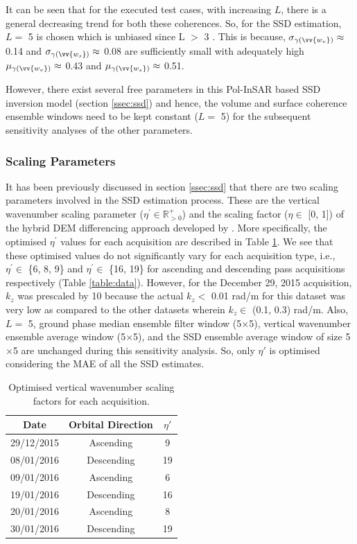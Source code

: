 \documentclass[12pt]{elsarticle}
\numberwithin{equation}{section}
\numberwithin{figure}{section}
\numberwithin{table}{section}
\begin{document}
It can be seen that for the executed test cases, with increasing $L$, there is a general decreasing trend for both these coherences. So, for the SSD estimation, $L =$ 5 is chosen which is unbiased since L $>$ 3 \citep{Cloude2010}. This is because, $\sigma_{\gamma\left(\vv{w_v}\right)} \approx$ 0.14 and $\sigma_{\gamma\left(\vv{w_s}\right)} \approx$ 0.08 are sufficiently small with adequately high $\mu_{\gamma\left(\vv{w_v}\right)} \approx$ 0.43 and $\mu_{\gamma\left(\vv{w_s}\right)} \approx$ 0.51. 

However, there exist several free parameters in this Pol-InSAR based SSD inversion model (section \ref{ssec:ssd}) and hence, the volume and surface coherence ensemble windows need to be kept constant ($L =$ 5) for the subsequent sensitivity analyses of the other parameters.

\subsubsection{Scaling Parameters}
\label{sssec:scale}
It has been previously discussed in section \ref{ssec:ssd} that there are two scaling parameters involved in the SSD estimation process. These are the vertical wavenumber scaling parameter ($\eta^\prime\in\mathbb{R}_{>0}^+$) and the scaling factor ($\eta\in$ [0, 1]) of the hybrid DEM differencing approach developed by \cite{Cloude2010}. More specifically, the optimised $\eta^\prime$ values for each acquisition are described in Table \ref{table:eta_sf}. We see that these optimised values do not significantly vary for each acquisition type, i.e., $\eta^\prime \in$ \{6, 8, 9\} and $\eta^\prime \in$ \{16, 19\} for ascending and descending pass acquisitions respectively (Table \ref{table:data}). However, for the December 29, 2015 acquisition, $k_z$ was prescaled by 10 because the actual $k_z <$ 0.01 rad/m for this dataset was very low as compared to the other datasets wherein $k_z \in$ (0.1, 0.3) rad/m. Also, $L =$ 5, ground phase median ensemble filter window (5$\times$5), vertical wavenumber ensemble average window (5$\times$5), and the SSD ensemble average window of size 5$\times$5 are unchanged during this sensitivity analysis. So, only $\eta\prime$ is optimised considering the MAE of all the SSD estimates.

\begin{table}[!htbp]
\centering
\caption{Optimised vertical wavenumber scaling factors for each acquisition.}
\label{table:eta_sf}
\begin{tabular}{ccc}
\hline
\textbf{Date} & \textbf{Orbital Direction} & \boldmath$\eta\prime$ \\ \hline
29/12/2015 & Ascending & 9   \\
08/01/2016 & Descending & 19  \\
09/01/2016 & Ascending & 6   \\
19/01/2016 & Descending & 16  \\
20/01/2016 & Ascending & 8   \\
30/01/2016 & Descending & 19 \\ \hline
\end{tabular}
\end{table}
\end{document}
